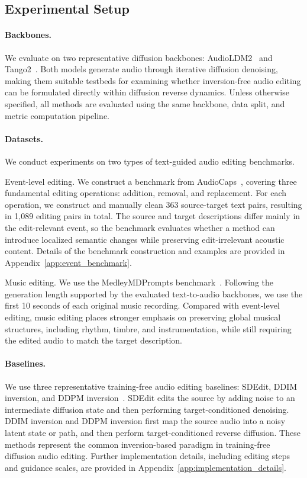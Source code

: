 \subsection{Experimental Setup}

\paragraph{Backbones.}
We evaluate \ourmethod{} on two representative diffusion backbones: AudioLDM2~\citep{liu2024audioldm} and Tango2~\citep{majumder2024tango}.
Both models generate audio through iterative diffusion denoising, making them suitable testbeds for examining whether inversion-free audio editing can be formulated directly within diffusion reverse dynamics.
Unless otherwise specified, all methods are evaluated using the same backbone, data split, and metric computation pipeline.

\paragraph{Datasets.}
We conduct experiments on two types of text-guided audio editing benchmarks.

Event-level editing. We construct a benchmark from AudioCaps~\citep{kim2019audiocaps}, covering three fundamental editing operations: addition, removal, and replacement. For each operation, we construct and manually clean 363 source-target text pairs, resulting in 1,089 editing pairs in total. The source and target descriptions differ mainly in the edit-relevant event, so the benchmark evaluates whether a method can introduce localized semantic changes while preserving edit-irrelevant acoustic content. Details of the benchmark construction and examples are provided in Appendix~\ref{app:event_benchmark}.

Music editing. We use the MedleyMDPrompts benchmark~\citep{manor2024zero}.
Following the generation length supported by the evaluated text-to-audio backbones, we use the first 10 seconds of each original music recording.
Compared with event-level editing, music editing places stronger emphasis on preserving global musical structures, including rhythm, timbre, and instrumentation, while still requiring the edited audio to match the target description.

\paragraph{Baselines.}
We use three representative training-free audio editing baselines: SDEdit, DDIM inversion, and DDPM inversion~\citep{manor2024zero}.
SDEdit edits the source by adding noise to an intermediate diffusion state and then performing target-conditioned denoising.
DDIM inversion and DDPM inversion first map the source audio into a noisy latent state or path, and then perform target-conditioned reverse diffusion.
These methods represent the common inversion-based paradigm in training-free diffusion audio editing.
Further implementation details, including editing steps and guidance scales, are provided in Appendix~\ref{app:implementation_details}.

